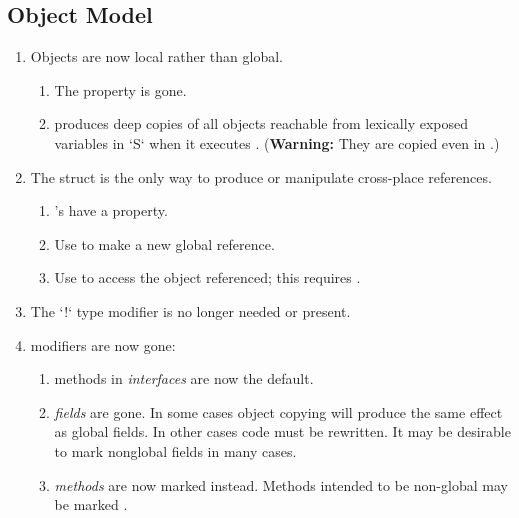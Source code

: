 \subsection{Object Model}

\begin{enumerate}
\item Objects are now local rather than global.
   
    \begin{enumerate}
    \item The  property is gone.
    \item {} produces deep copies of all objects reachable from
          lexically exposed variables in \xcd`S` 
          when it executes .  ({\bf Warning:} They are copied even in  
          .)
    \end{enumerate}

\item The  struct is the only way to produce or manipulate
      cross-place references.
    \begin{enumerate}
    \item {}'s have a  property.
    \item Use  to make a new global reference.
    \item Use  to access the object referenced; this
          requires . 
    \end{enumerate}


\item  The \xcd`!` type modifier is no longer needed or present.

\item {} modifiers are now gone:
    
    \begin{enumerate}
    \item {} methods in {\em interfaces} are now the default. 
    \item {} {\em fields} are gone.  In some cases object copying
          will produce the same effect as global fields.  In other cases code
          must be rewritten.  It may be desirable to mark nonglobal fields
           in many cases.
    \item {} {\em methods} are now marked  instead.  
          Methods intended to be non-global may be marked .
    \end{enumerate}


\end{enumerate}

